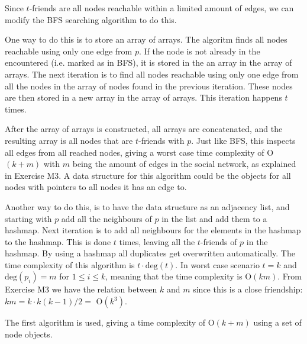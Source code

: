 \documentclass[10pt]{article}
\begin{document}
Since $t$-friends are all nodes reachable within a limited amount of edges, we can modify the BFS searching algorithm to do this.

One way to do this is to store an array of arrays. The algoritm finds all nodes reachable using only one edge from $p$. If the node is not already in the encountered (i.e. marked as in BFS), it is stored in the an array in the array of arrays. The next iteration is to find all nodes reachable using only one edge from all the nodes in the array of nodes found in the previous iteration. These nodes are then stored in a new array in the array of arrays. This iteration happens $t$ times.

After the array of arrays is constructed, all arrays are concatenated, and the resulting array is all nodes that are $t$-friends with $p$. Just like BFS, this inspects all edges from all reached nodes, giving a worst case time complexity of O$(k + m)$ with $m$ being the amount of edges in the social network, as explained in Exercise M3. A data structure for this algorithm could be the objects for all nodes with pointers to all nodes it has an edge to. 

Another way to do this, is to have the data structure as an adjacency list, and starting with $p$ add all the neighbours of $p$ in the list and add them to a hashmap. Next iteration is to add all neighbours for the elements in the hashmap to the hashmap. This is done $t$ times, leaving all the $t$-friends of $p$ in the hashmap. By using a hashmap all duplicates get overwritten automatically. The time complexity of this algorithm is $t\cdot \text{deg}(t)$. In worst case scenario $t = k$ and $\text{deg}(p_i)=m$ for $1 \leq i \leq k$, meaning that the time complexity is O$(km)$. From Exercise M3 we have the relation between $k$ and $m$ since this is a close friendship: $km = k\cdot k(k-1)/2 = $ O$(k^3)$. 

The first algorithm is used, giving a time complexity of O$(k+m)$ using a set of node objects.
\end{document}
